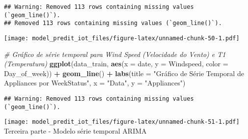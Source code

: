 \documentclass[
]{article}
\newenvironment{Shaded}{\begin{snugshade}}{\end{snugshade}}
\newcommand{\AttributeTok}[1]{\textcolor[rgb]{0.13,0.29,0.53}{#1}}
\newcommand{\CommentTok}[1]{\textcolor[rgb]{0.56,0.35,0.01}{\textit{#1}}}
\newcommand{\DecValTok}[1]{\textcolor[rgb]{0.00,0.00,0.81}{#1}}
\newcommand{\FunctionTok}[1]{\textcolor[rgb]{0.13,0.29,0.53}{\textbf{#1}}}
\newcommand{\NormalTok}[1]{#1}
\newcommand{\OtherTok}[1]{\textcolor[rgb]{0.56,0.35,0.01}{#1}}
\newcommand{\SpecialCharTok}[1]{\textcolor[rgb]{0.81,0.36,0.00}{\textbf{#1}}}
\newcommand{\StringTok}[1]{\textcolor[rgb]{0.31,0.60,0.02}{#1}}
\begin{document}
\begin{verbatim}
## Warning: Removed 113 rows containing missing values (`geom_line()`).
## Removed 113 rows containing missing values (`geom_line()`).
\end{verbatim}

\texttt{[image: model\_predit\_iot\_files/figure-latex/unnamed-chunk-50-1.pdf]}

\begin{Shaded}
\begin{Highlighting}[]
\CommentTok{\# Gráfico de série temporal para Wind Speed (Velocidade do Vento) e T1 (Temperatura)}
\FunctionTok{ggplot}\NormalTok{(data\_train, }\FunctionTok{aes}\NormalTok{(}\AttributeTok{x =}\NormalTok{ date, }\AttributeTok{y =}\NormalTok{ Windspeed, }\AttributeTok{color =}\NormalTok{ Day\_of\_week)) }\SpecialCharTok{+}
  \FunctionTok{geom\_line}\NormalTok{() }\SpecialCharTok{+}
  \FunctionTok{labs}\NormalTok{(}\AttributeTok{title =} \StringTok{"Gráfico de Série Temporal de Appliances por WeekStatus"}\NormalTok{,}
       \AttributeTok{x =} \StringTok{"Data"}\NormalTok{,}
       \AttributeTok{y =} \StringTok{"Appliances"}\NormalTok{)}
\end{Highlighting}
\end{Shaded}

\begin{verbatim}
## Warning: Removed 113 rows containing missing values (`geom_line()`).
\end{verbatim}

\texttt{[image: model\_predit\_iot\_files/figure-latex/unnamed-chunk-51-1.pdf]}
Terceira parte - Modelo série temporal ARIMA

\begin{Shaded}
\end{Shaded}

\begin{Shaded}
\end{Shaded}
\end{document}
